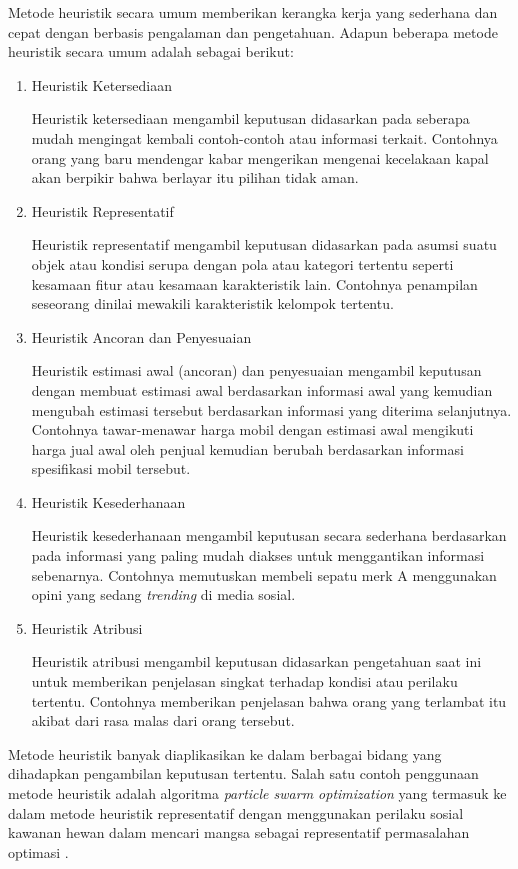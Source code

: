 {    Metode heuristik secara umum memberikan kerangka kerja yang sederhana dan cepat dengan berbasis pengalaman dan pengetahuan.
    Adapun beberapa metode heuristik secara umum adalah sebagai berikut:
    \begin{enumerate}[align=left, left = 0mm, nolistsep]
        \item Heuristik Ketersediaan \par \nobreak
              Heuristik ketersediaan mengambil keputusan didasarkan pada seberapa mudah mengingat kembali contoh-contoh atau informasi terkait.
              Contohnya orang yang baru mendengar kabar mengerikan mengenai kecelakaan kapal akan berpikir bahwa berlayar itu pilihan tidak aman.
        \item Heuristik Representatif \par \nobreak
              Heuristik representatif mengambil keputusan didasarkan pada asumsi suatu objek atau kondisi serupa dengan pola atau kategori tertentu seperti kesamaan fitur atau kesamaan karakteristik lain.
              Contohnya penampilan seseorang dinilai mewakili karakteristik kelompok tertentu.
        \item Heuristik Ancoran dan Penyesuaian \par \nobreak
              Heuristik estimasi awal (ancoran) dan penyesuaian mengambil keputusan dengan membuat estimasi awal berdasarkan informasi awal yang kemudian mengubah estimasi tersebut berdasarkan informasi yang diterima selanjutnya.
              Contohnya tawar-menawar harga mobil dengan estimasi awal mengikuti harga jual awal oleh penjual kemudian berubah berdasarkan informasi spesifikasi mobil tersebut.
        \item Heuristik Kesederhanaan \par \nobreak
              Heuristik kesederhanaan mengambil keputusan secara sederhana berdasarkan pada informasi yang paling mudah diakses untuk menggantikan informasi sebenarnya.
              Contohnya memutuskan membeli sepatu merk A menggunakan opini yang sedang \textit{trending} di media sosial.
        \item Heuristik Atribusi \par \nobreak
              Heuristik atribusi mengambil keputusan didasarkan pengetahuan saat ini untuk memberikan penjelasan singkat terhadap kondisi atau perilaku tertentu.
              Contohnya memberikan penjelasan bahwa orang yang terlambat itu akibat dari rasa malas dari orang tersebut.
    \end{enumerate}

    \noindent
    Metode heuristik banyak diaplikasikan ke dalam berbagai bidang yang dihadapkan pengambilan keputusan tertentu.
    Salah satu contoh penggunaan metode heuristik adalah algoritma \textit{particle swarm optimization} yang termasuk ke dalam metode heuristik representatif dengan menggunakan
    perilaku sosial kawanan hewan dalam mencari mangsa sebagai representatif permasalahan optimasi .
}
\vspace{-3mm}

